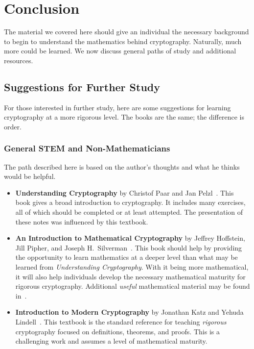 \chapter{Conclusion}
\label{chap:conclusion}

The material we covered here should give an individual the necessary
background to begin to understand the mathematics behind cryptography.
Naturally, much more could be learned.
We now discuss general paths of study and additional resources.



\section{Suggestions for Further Study}

For those interested in further study, here are some suggestions
for learning cryptography at a more rigorous level.
The books are the same;
the difference is order.

\subsection{General STEM and Non-Mathematicians}

The path described here is based on the author's thoughts
and what he thinks would be helpful.

\begin{itemize}
    \item \textbf{Understanding Cryptography} by Christof Paar
    and Jan Pelzl~\cite{UnderstandingCrypto}.
    This book gives a broad introduction to cryptography.
    It includes many exercises, all of which should be completed
    or at least attempted.
    The presentation of these notes was influenced by this textbook.
\item \textbf{An Introduction to Mathematical Cryptography}
    by Jeffrey Hoffstein, Jill Pipher,
    and Joseph H.~Silverman~\cite{IntroMathCrypto}.
    This book should help by providing the opportunity to learn
    mathematics at a deeper level than what may be learned from
    \emph{Understanding Cryptography}.
    With it being more mathematical,
    it will also help individuals develop the necessary mathematical
    maturity for rigorous cryptography.
    Additional \emph{useful} mathematical material may be found
    in~\cite{ComputationalIntroNTA}.
\item \textbf{Introduction to Modern Cryptography}
    by Jonathan Katz and Yehuda Lindell~\cite{IntroModernCrypto}.
    This textbook is the standard reference for teaching \emph{rigorous}
    cryptography focused on definitions, theorems, and proofs.
    This is a challenging work and assumes a level of mathematical maturity.
\end{itemize}

